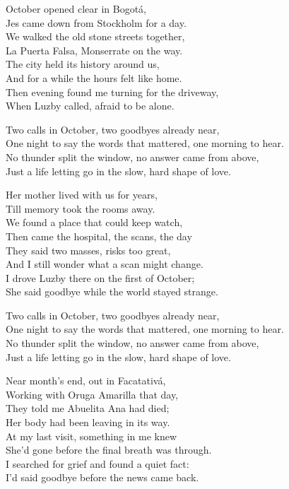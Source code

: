 \begin{lyrics}
October opened clear in Bogotá,\\
Jes came down from Stockholm for a day.\\
We walked the old stone streets together,\\
La Puerta Falsa, Monserrate on the way.\\
The city held its history around us,\\
And for a while the hours felt like home.\\
Then evening found me turning for the driveway,\\
When Luzby called, afraid to be alone.

Two calls in October, two goodbyes already near,\\
One night to say the words that mattered, one morning to hear.\\
No thunder split the window, no answer came from above,\\
Just a life letting go in the slow, hard shape of love.

Her mother lived with us for years,\\
Till memory took the rooms away.\\
We found a place that could keep watch,\\
Then came the hospital, the scans, the day\\
They said two masses, risks too great,\\
And I still wonder what a scan might change.\\
I drove Luzby there on the first of October;\\
She said goodbye while the world stayed strange.

Two calls in October, two goodbyes already near,\\
One night to say the words that mattered, one morning to hear.\\
No thunder split the window, no answer came from above,\\
Just a life letting go in the slow, hard shape of love.

Near month’s end, out in Facatativá,\\
Working with Oruga Amarilla that day,\\
They told me Abuelita Ana had died;\\
Her body had been leaving in its way.\\
At my last visit, something in me knew\\
She’d gone before the final breath was through.\\
I searched for grief and found a quiet fact:\\
I’d said goodbye before the news came back.


\end{lyrics}
